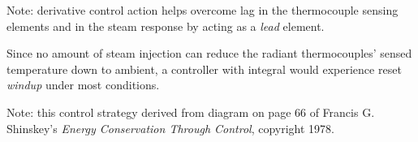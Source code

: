 \vskip 10pt

Note: derivative control action helps overcome lag in the thermocouple sensing elements and in the steam response by acting as a {\it lead} element.

\vskip 30pt

Since no amount of steam injection can reduce the radiant thermocouples' sensed temperature down to ambient, a controller with integral would experience reset {\it windup} under most conditions.







Note: this control strategy derived from diagram on page 66 of Francis G. Shinskey's {\it Energy Conservation Through Control}, copyright 1978.




